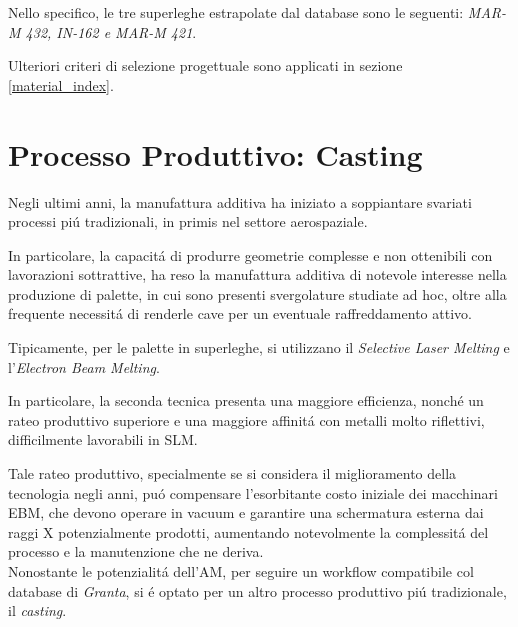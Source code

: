 \documentclass{article}
\begin{document}
        Nello specifico, le tre superleghe estrapolate dal database sono le seguenti:
        \textit{MAR-M 432, IN-162 e MAR-M 421}.

        Ulteriori criteri di selezione progettuale sono applicati in sezione \ref{material_index}.

    \clearpage

    \section{Processo Produttivo: Casting\label{Casting}}

    Negli ultimi anni, la manufattura additiva ha iniziato a soppiantare svariati 
    processi piú tradizionali, in primis nel settore aerospaziale. 

    In particolare, la capacitá di produrre geometrie complesse e non ottenibili
    con lavorazioni sottrattive, ha reso la manufattura additiva di notevole interesse 
    nella produzione di palette, in cui sono presenti svergolature studiate ad hoc, 
    oltre alla frequente necessitá di renderle cave per un eventuale raffreddamento attivo.

    Tipicamente, per le palette in superleghe, si utilizzano il 
    \textit{Selective Laser Melting} e l'\textit{Electron Beam Melting}.
    
    In particolare, la seconda tecnica presenta una maggiore efficienza, nonché un rateo
    produttivo superiore e una maggiore affinitá con metalli molto
    riflettivi, difficilmente lavorabili
    in SLM.
    
    Tale rateo produttivo, specialmente se si considera il miglioramento della tecnologia
    negli anni, puó compensare l'esorbitante costo iniziale dei macchinari EBM, che devono operare in vacuum
    e garantire una schermatura esterna dai raggi X potenzialmente prodotti, aumentando
    notevolmente la complessitá del processo e la manutenzione che ne deriva. \\ 

    Nonostante le potenzialitá dell'AM, per seguire un workflow compatibile col database di \textit{Granta}, si é optato
    per un altro processo produttivo piú tradizionale, il \textit{casting}. 
\end{document}
